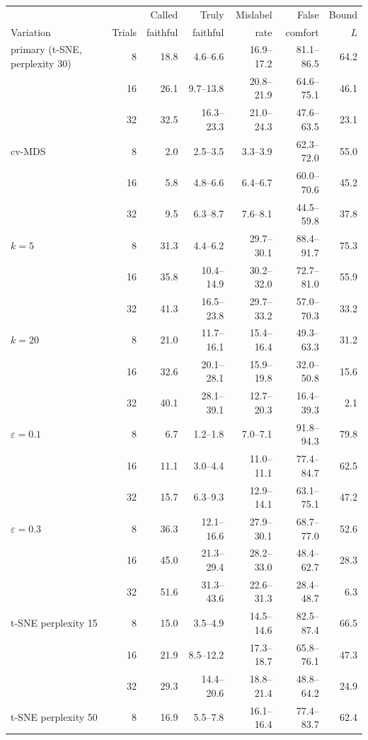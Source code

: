 \begin{tabular}{lrrrrrr}
\toprule
 & & Called & Truly & Mislabel & False & Bound \\
Variation & Trials & faithful & faithful & rate & comfort & $L$ \\
\midrule
primary (t-SNE, perplexity 30) & 8 & 18.8 & 4.6--6.6 & 16.9--17.2 & 81.1--86.5 & 64.2 \\
 & 16 & 26.1 & 9.7--13.8 & 20.8--21.9 & 64.6--75.1 & 46.1 \\
 & 32 & 32.5 & 16.3--23.3 & 21.0--24.3 & 47.6--63.5 & 23.1 \\
\addlinespace
cv-MDS & 8 & 2.0 & 2.5--3.5 & 3.3--3.9 & 62.3--72.0 & 55.0 \\
 & 16 & 5.8 & 4.8--6.6 & 6.4--6.7 & 60.0--70.6 & 45.2 \\
 & 32 & 9.5 & 6.3--8.7 & 7.6--8.1 & 44.5--59.8 & 37.8 \\
\addlinespace
$k=5$ & 8 & 31.3 & 4.4--6.2 & 29.7--30.1 & 88.4--91.7 & 75.3 \\
 & 16 & 35.8 & 10.4--14.9 & 30.2--32.0 & 72.7--81.0 & 55.9 \\
 & 32 & 41.3 & 16.5--23.8 & 29.7--33.2 & 57.0--70.3 & 33.2 \\
\addlinespace
$k=20$ & 8 & 21.0 & 11.7--16.1 & 15.4--16.4 & 49.3--63.3 & 31.2 \\
 & 16 & 32.6 & 20.1--28.1 & 15.9--19.8 & 32.0--50.8 & 15.6 \\
 & 32 & 40.1 & 28.1--39.1 & 12.7--20.3 & 16.4--39.3 & 2.1 \\
\addlinespace
$\varepsilon=0.1$ & 8 & 6.7 & 1.2--1.8 & 7.0--7.1 & 91.8--94.3 & 79.8 \\
 & 16 & 11.1 & 3.0--4.4 & 11.0--11.1 & 77.4--84.7 & 62.5 \\
 & 32 & 15.7 & 6.3--9.3 & 12.9--14.1 & 63.1--75.1 & 47.2 \\
\addlinespace
$\varepsilon=0.3$ & 8 & 36.3 & 12.1--16.6 & 27.9--30.1 & 68.7--77.0 & 52.6 \\
 & 16 & 45.0 & 21.3--29.4 & 28.2--33.0 & 48.4--62.7 & 28.3 \\
 & 32 & 51.6 & 31.3--43.6 & 22.6--31.3 & 28.4--48.7 & 6.3 \\
\addlinespace
t-SNE perplexity 15 & 8 & 15.0 & 3.5--4.9 & 14.5--14.6 & 82.5--87.4 & 66.5 \\
 & 16 & 21.9 & 8.5--12.2 & 17.3--18.7 & 65.8--76.1 & 47.3 \\
 & 32 & 29.3 & 14.4--20.6 & 18.8--21.4 & 48.8--64.2 & 24.9 \\
\addlinespace
t-SNE perplexity 50 & 8 & 16.9 & 5.5--7.8 & 16.1--16.4 & 77.4--83.7 & 62.4 \\

\end{tabular}
